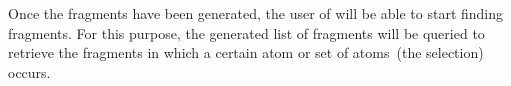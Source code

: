 Once the fragments have been generated, the user of \oframp{} will be able to start finding fragments. For this purpose, the generated list of fragments will be queried to retrieve the fragments in which a certain atom or set of atoms~(the selection) occurs.
